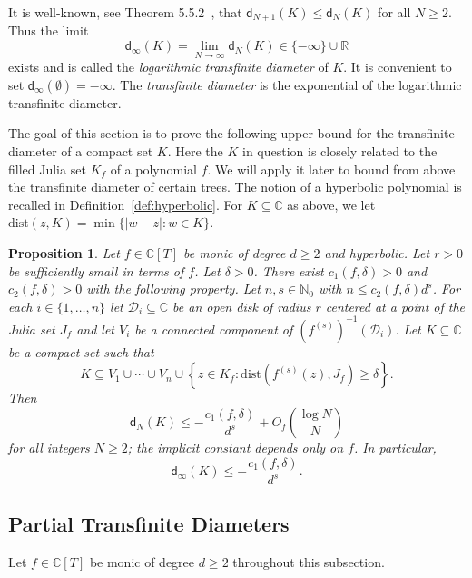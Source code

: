 \documentclass[12pt,oneside,a4]{amsart}
\newcommand{\IC}{\mathbb{C}}
\newcommand{\IN}{\mathbb{N}}
\newcommand{\IR}{\mathbb{R}}
\newcounter{maincounter}
\numberwithin{maincounter}{section}
\numberwithin{equation}{section}
\newtheorem{proposition}[maincounter]{Proposition}
\renewcommand{\subset}{\subseteq}
\begin{document}
It is well-known, see Theorem 5.5.2~\cite{Ransford}, that
$\mathsf{d}_{N+1}(K)\le \mathsf{d}_{N}(K)$ for all $N\ge 2$. Thus the limit
\begin{equation}
  \label{def:dinfty}
  \mathsf{d}_\infty(K) = \lim_{N\rightarrow\infty} \mathsf{d}_N(K) \in \{-\infty\}\cup\IR
\end{equation}
exists and is called the \textit{logarithmic transfinite diameter} of
$K$. It is convenient to set $\mathsf{d}_\infty(\emptyset)=-\infty$. The
\textit{transfinite diameter} is the exponential of the
logarithmic transfinite diameter.


The goal of this section is to prove the following upper bound for the
transfinite diameter of a compact set $K$. Here the $K$ in question is
closely related to the filled Julia set $K_f$ of a polynomial $f$. 
We will apply it later to bound from above the
transfinite diameter of certain trees.
The notion of a hyperbolic polynomial is recalled in
Definition~\ref{def:hyperbolic}.
For $K\subset\IC$ as above, we let
$\mathrm{dist}(z,K) = \min\{|w-z| : w\in K\}$.

\begin{proposition}
  \label{prop:transfiniteapplication}
  Let $f\in\IC[T]$ be monic of degree $d\ge 2$ and hyperbolic. Let
  $r>0$ be sufficiently small in terms of $f$. Let $\delta >0$. There
  exist $c_{1}(f,\delta)>0$ and $c_2(f,\delta)>0$ with the following property. Let
  $n,s\in\IN_0$ with $n\le c_2(f,\delta) d^s$. For each $i\in \{1,\ldots,n\}$ let
  $\mathcal{D}_i\subset\IC$ be an open disk of radius $r$ centered at a point of
  the Julia set
  $J_f$ and let $V_i$ be
  a connected component of $(f^{(s)})^{-1}(\mathcal{D}_i)$. Let
  $K\subset\IC$ be a compact set such that
  \begin{equation}
    \label{eq:propKcontained}
    K \subset V_1\cup\cdots\cup V_n \cup \left\{z\in K_f :
    \mathrm{dist}(f^{(s)}(z),J_f)\ge \delta\right\}.
  \end{equation}
  Then
  \begin{equation}
    \label{eq:corcDNub}
    \mathsf{d}_N(K) \le -\frac{c_1(f,\delta)}{d^s} +
    O_{f}\left(\frac{\log N}{N}\right)
  \end{equation}
  for all integers $N\ge 2$; the implicit constant depends only on $f$. In particular,
  $$\mathsf{d}_\infty(K)\le -\frac{c_1(f,\delta)}{d^s}.$$
\end{proposition}


\subsection{Partial Transfinite Diameters}
Let $f\in\IC[T]$ be monic of degree $d\ge 2$ throughout this subsection.
\end{document}
